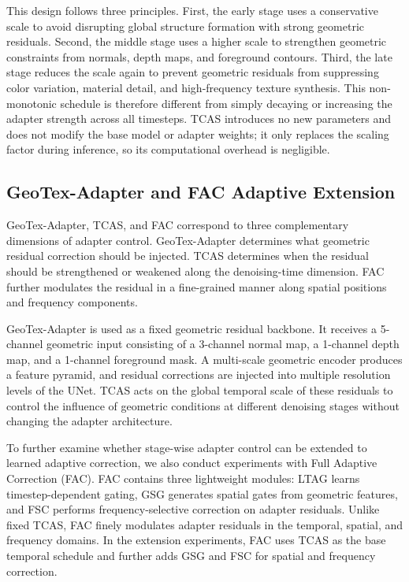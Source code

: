 \documentclass[times,twocolumn,final]{elsarticle}
\begin{document}
This design follows three principles. First, the early stage uses a conservative scale to avoid disrupting global structure formation with strong geometric residuals. Second, the middle stage uses a higher scale to strengthen geometric constraints from normals, depth maps, and foreground contours. Third, the late stage reduces the scale again to prevent geometric residuals from suppressing color variation, material detail, and high-frequency texture synthesis. This non-monotonic schedule is therefore different from simply decaying or increasing the adapter strength across all timesteps. TCAS introduces no new parameters and does not modify the base model or adapter weights; it only replaces the scaling factor during inference, so its computational overhead is negligible.

\subsection{GeoTex-Adapter and FAC Adaptive Extension}
\label{subsec:fac}

GeoTex-Adapter, TCAS, and FAC correspond to three complementary dimensions of adapter control. GeoTex-Adapter determines what geometric residual correction should be injected. TCAS determines when the residual should be strengthened or weakened along the denoising-time dimension. FAC further modulates the residual in a fine-grained manner along spatial positions and frequency components.

GeoTex-Adapter is used as a fixed geometric residual backbone. It receives a 5-channel geometric input consisting of a 3-channel normal map, a 1-channel depth map, and a 1-channel foreground mask. A multi-scale geometric encoder produces a feature pyramid, and residual corrections are injected into multiple resolution levels of the UNet. TCAS acts on the global temporal scale of these residuals to control the influence of geometric conditions at different denoising stages without changing the adapter architecture.

To further examine whether stage-wise adapter control can be extended to learned adaptive correction, we also conduct experiments with Full Adaptive Correction (FAC). FAC contains three lightweight modules: LTAG learns timestep-dependent gating, GSG generates spatial gates from geometric features, and FSC performs frequency-selective correction on adapter residuals. Unlike fixed TCAS, FAC finely modulates adapter residuals in the temporal, spatial, and frequency domains. In the extension experiments, FAC uses TCAS as the base temporal schedule and further adds GSG and FSC for spatial and frequency correction.
\end{document}
